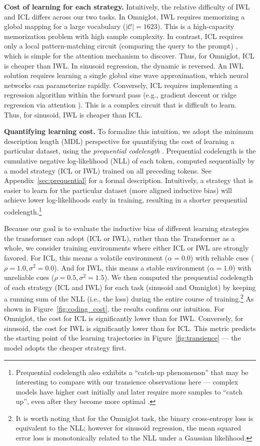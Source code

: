 \textbf{Cost of learning for each strategy.}
Intuitively, the relative difficulty of IWL and ICL differs across our two tasks.
In Omniglot, IWL requires memorizing a global mapping for a large vocabulary ($|\mathcal{C}| = 1623$). This is a high-capacity memorization problem with high sample complexity. In contrast, ICL requires only a local pattern-matching circuit (comparing the query to the prompt) \cite{olsson2022context, singh_what_2024}, which is simple for the attention mechanism to discover. Thus, for Omniglot, ICL is cheaper than IWL.
In sinusoid regression, the dynamic is reversed. An IWL solution requires learning a single global sine wave approximation, which neural networks can parameterize rapidly. Conversely, ICL requires implementing a regression algorithm within the forward pass (e.g., gradient descent or ridge regression via attention \cite{von2023transformers}). This is a complex circuit that is difficult to learn. Thus, for sinusoid, IWL is cheaper than ICL.

\textbf{Quantifying learning cost.} To formalize this intuition, we adopt the minimum description length (MDL) perspective for quantifying the cost of learning a particular dataset, using the \textit{prequential codelength} \cite{blier2018description}.
Prequential codelength is the cumulative negative log-likelihood (NLL) of each token, computed sequentially by a model strategy (ICL or IWL) trained on all preceding tokens. See Appendix~\ref{sec:prequential} for a formal description. Intuitively, a strategy that is easier to learn for the particular dataset (more aligned inductive bias) will achieve lower log-likelihoods early in training, resulting in a shorter prequential codelength.\footnote{Prequential codelength also exhibits a ``catch-up phenomenon'' that may be interesting to compare with our transience observations here --- complex models have higher cost initially and later require more samples to ``catch up'', even after they become more optimal \cite{erven_catching_2012}.}

Because our goal is to evaluate the inductive bias of different learning strategies the transformer can adopt (ICL or IWL), rather than the Transformer as a whole, we consider training environments where either ICL or IWL are strongly favored. For ICL, this means a volatile environment ($\alpha=0.0$) with reliable cues ($\rho=1.0, \sigma^2=0.0$). And for IWL, this means a stable environment ($\alpha=1.0$) with unreliable cues ($\rho=0.5, \sigma^2=1.5$). We then computed the prequential codelength of each strategy (ICL and IWL) for each task (sinusoid and Omniglot) by keeping a running sum of the NLL (i.e., the loss) during the entire course of training.\footnote{It is worth noting that for the Omniglot task, the binary cross-entropy loss is equivalent to the NLL; however for sinusoid regression, the mean squared error loss is monotonically related to the NLL under a Gaussian likelihood.}
As shown in Figure~\ref{fig:coding_cost}, the results confirm our intuition. For Omniglot, the cost for ICL is significantly lower than for IWL. Conversely, for sinusoid, the cost for IWL is significantly lower than for ICL. This metric predicts the starting point of the learning trajectories in Figure~\ref{fig:transience} --- the model adopts the cheaper strategy first.

